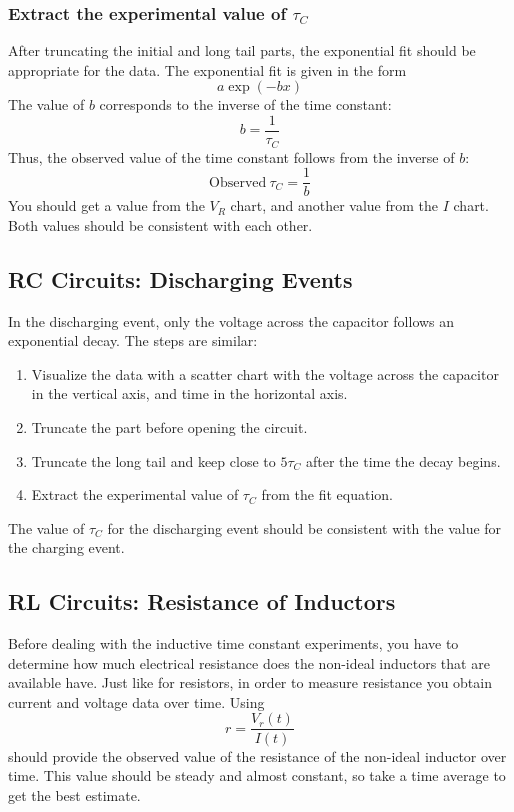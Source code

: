 \subsubsection{Extract the experimental value of $\tau_{C}$}
%
After truncating the initial and long tail parts, the exponential fit should be appropriate for the data. The exponential fit is given in the form
\begin{equation}
    a \exp(-bx)
\end{equation}
The value of $b$ corresponds to the inverse of the time constant:
\begin{equation}
    b = \frac{1}{\tau_{C}}
\end{equation}
Thus, the observed value of the time constant follows from the inverse of $b$:
\begin{equation}
    \text{Observed} \ \tau_{C} = \frac{1}{b}
\end{equation}
You should get a value from the $V_{R}$ chart, and another value from the $I$ chart. Both values should be consistent with each other.
%
\subsection{RC Circuits: Discharging Events}
%
In the discharging event, only the voltage across the capacitor follows an exponential decay. The steps are similar:
\begin{enumerate}
    \item Visualize the data with a scatter chart with the voltage across the capacitor in the vertical axis, and time in the horizontal axis.
    \item Truncate the part before opening the circuit.
    \item Truncate the long tail and keep close to $5\tau_{C}$ after the time the decay begins.
    \item Extract the experimental value of $\tau_{C}$ from the fit equation.
\end{enumerate}
The value of $\tau_{C}$ for the discharging event should be consistent with the value for the charging event.
%
\subsection{RL Circuits: Resistance of Inductors}
%
Before dealing with the inductive time constant experiments, you have to determine how much electrical resistance does the non-ideal inductors that are available have. Just like for resistors, in order to measure resistance you obtain current and voltage data over time. Using
\begin{equation}
    r = \frac{V_{r}(t)}{I(t)}
\end{equation}
should provide the observed value of the resistance of the non-ideal inductor over time. This value should be steady and almost constant, so take a time average to get the best estimate.


